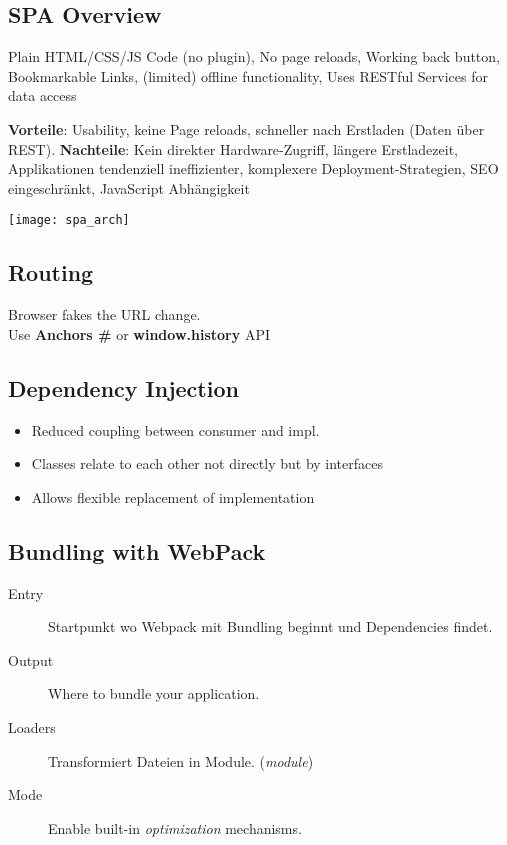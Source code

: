 

\newcommand{\TITLE}{Web Engineering 3}
\newcommand{\AUTHOR}{Mona Panchaud}
\newcommand{\INSTITUTE}{Ostschweizer Fachhochschule}




\begin{multicols*}{2}

\section{SPA Overview}
Plain HTML/CSS/JS Code (no plugin), No page reloads,
Working back button,
Bookmarkable Links,
(limited) offline functionality,
Uses RESTful Services for data access

\textbf{Vorteile}: Usability, keine Page reloads, schneller nach Erstladen (Daten über REST).
\textbf{Nachteile}: Kein direkter Hardware-Zugriff, längere Erstladezeit, Applikationen tendenziell ineffizienter, komplexere Deployment-Strategien, SEO eingeschränkt, JavaScript Abhängigkeit

\texttt{[image: spa\_arch]}

\subsection{Routing}
Browser fakes the URL change.
\\
Use \textbf{Anchors \#} or \textbf{window.history} API

\subsection{Dependency Injection}
\begin{itemize}
    \item Reduced coupling between consumer and impl.
    \item Classes relate to each other not directly but by interfaces
    \item Allows flexible replacement of implementation
\end{itemize}

\subsection{Bundling with WebPack}
\begin{description}
    \item[Entry] Startpunkt wo Webpack mit Bundling beginnt und
    Dependencies findet.
    \item[Output] Where to bundle your application.
    \item[Loaders] Transformiert Dateien in Module. (\textit{module})
    \item[Mode] Enable built-in \textit{optimization} mechanisms.
\end{description}


\end{multicols*}

